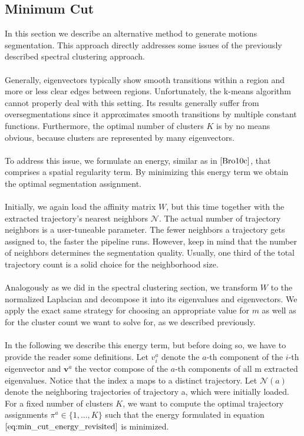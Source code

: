 \subsection{Minimum Cut} 
In this section we describe an alternative method to generate motions segmentation. This approach directly addresses some issues of the previously described spectral clustering approach. \\ \\
Generally, eigenvectors typically show smooth transitions within a region and more or less clear edges between regions. Unfortunately, the k-means algorithm cannot properly deal with this setting. Its results generally suffer from oversegmentations since it approximates smooth transitions by multiple constant functions. Furthermore, the optimal number of clusters $K$ is by no means obvious, because clusters are represented by many eigenvectors. \\ \\
To address this issue, we formulate an energy, similar as in $\cite{Bro10c}$, that comprises a spatial regularity term. By minimizing this energy term we obtain the optimal segmentation assignment. \\ \\
Initially, we again load the affinity matrix $W$, but this time together with the extracted trajectory's nearest neighbors $\mathcal{N}$. The actual number of trajectory neighbors is a user-tuneable parameter. The fewer neighbors a trajectory gets assigned to, the faster the pipeline runs. However, keep in mind that the number of neighbors determines the segmentation quality. Usually, one third of the total trajectory count is a solid choice for the neighborhood size. \\ \\ 
Analogously as we did in the spectral clustering section, we transform $W$ to the normalized Laplacian and decompose it into its eigenvalues and eigenvectors. We apply the exact same strategy for choosing an appropriate value for $m$ as well as for the cluster count we want to solve for, as we described previously. \\ \\
In the following we describe this energy term, but before doing so, we have to provide the reader some definitions. Let $v_i^a$ denote the $a$-th component of the $i$-th eigenvector and $\textbf{v}^a$ the vector compose of the $a$-th components of all m extracted eigenvalues. Notice that the index a maps to a distinct trajectory. Let $\mathcal{N} \left( a \right)$ denote the neighboring trajectories of trajectory a, which were initially loaded. For a fixed number of clusters $K$, we want to compute the optimal trajectory assignments $\pi^{a} \in \{ 1, \dots , K \}$ such that the energy formulated in equation $\ref{eq:min_cut_energy_revisited}$ is minimized.
